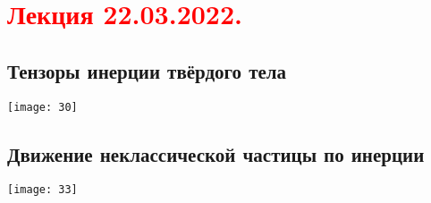 \documentclass[main.tex]{subfiles}
\begin{document}
\section{\textcolor{red}{Лекция 22.03.2022.}}

\subsection{Тензоры инерции твёрдого тела}
\texttt{[image: 30]}



\subsection{Движение неклассической частицы по инерции}
\texttt{[image: 33]}


\end{document}
